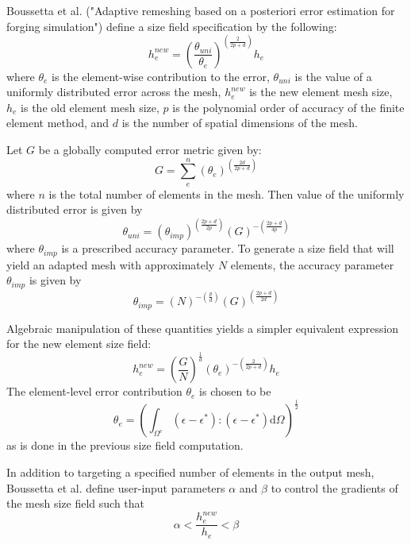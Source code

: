 \documentclass{article}
\begin{document}
Boussetta et al. ("Adaptive remeshing based on a posteriori error
estimation for forging simulation") define a size field specification
by the following:
\[
h^{new}_e = \left(
\frac{\theta_{uni}}{\theta_e} \right)
^{( \frac{2}{2p +d} )} h_e
\]
where $\theta_e$ is the element-wise contribution to the error,
$\theta_{uni}$ is the value of a uniformly distributed error
across the mesh, $h_e^{new}$ is the new element mesh size,
$h_e$ is the old element mesh size, $p$ is the polynomial order
of accuracy of the finite element method, and $d$ is the number
of spatial dimensions of the mesh.

Let $G$ be a globally computed error metric given by:
\[
G = \sum_e^n \left( \theta_e \right) ^{(\frac{2d}{2p+d})}
\]
where $n$ is the total number of elements in the mesh.
Then value of the uniformly distributed error is given by
\[
\theta_{uni} = \left( \theta_{imp} \right) ^{( \frac{2p+d}{2p} )}
\left( G \right) ^{-(\frac{2p+d}{4p} )}
\]
where $\theta_{imp}$ is a prescribed accuracy parameter. 
To generate a size field that will yield an adapted
mesh with approximately $N$ elements, the accuracy parameter
$\theta_{imp}$ is given by
\[
\theta_{imp} = \left( N \right) ^{-(\frac{p}{d})}
\left( G \right)^{(\frac{2p+d}{2d})}
\]

Algebraic manipulation of these quantities yields a simpler
equivalent expression for the new element size field:
\[
h_e^{new} = \left(\frac{G}{N}\right)^{\frac{1}{d}}
\left( \theta_e \right)^{-(\frac{2}{2p+d})} h_e
\]
The element-level error contribution $\theta_e$ is chosen to be
\[
\theta_e = \left( 
\int_{\Omega^e}(\epsilon - \epsilon^*) : (\epsilon - \epsilon^*)
\text{d} \Omega
\right) ^{\frac{1}{2}}
\]
as is done in the previous size field computation.

In addition to targeting a specified number of elements in the
output mesh, Boussetta et al. define user-input parameters
$\alpha$ and $\beta$ to control the gradients of the mesh size
field such that
\[
\alpha < \frac{h_e^{new}}{h_e} < \beta
\]
\end{document}
